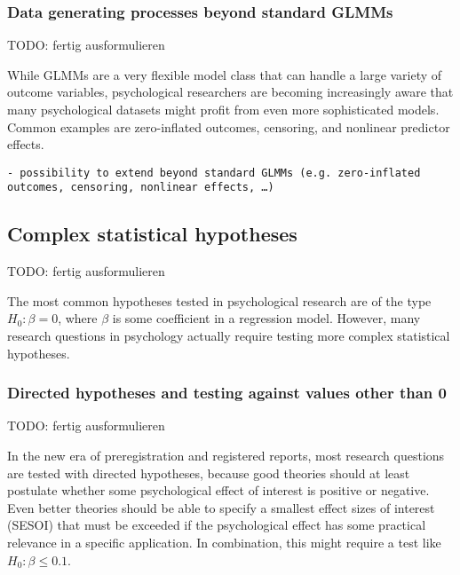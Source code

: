 \documentclass[
  man,floatsintext]{apa6}
\begin{document}
\hypertarget{data-generating-processes-beyond-standard-glmms}{%
\subsubsection{Data generating processes beyond standard GLMMs}\label{data-generating-processes-beyond-standard-glmms}}

TODO: fertig ausformulieren

While GLMMs are a very flexible model class that can handle a large variety of outcome variables, psychological researchers are becoming increasingly aware that many psychological datasets might profit from even more sophisticated models.
Common examples are zero-inflated outcomes, censoring, and nonlinear predictor effects.

\begin{verbatim}
- possibility to extend beyond standard GLMMs (e.g. zero-inflated outcomes, censoring, nonlinear effects, …)
\end{verbatim}

\hypertarget{complex-statistical-hypotheses}{%
\subsection{Complex statistical hypotheses}\label{complex-statistical-hypotheses}}

TODO: fertig ausformulieren

The most common hypotheses tested in psychological research are of the type \(H_0: \beta = 0\), where \(\beta\) is some coefficient in a regression model.
However, many research questions in psychology actually require testing more complex statistical hypotheses.

\hypertarget{directed-hypotheses-and-testing-against-values-other-than-0}{%
\subsubsection{Directed hypotheses and testing against values other than 0}\label{directed-hypotheses-and-testing-against-values-other-than-0}}

TODO: fertig ausformulieren

In the new era of preregistration and registered reports, most research questions are tested with directed hypotheses, because good theories should at least postulate whether some psychological effect of interest is positive or negative.
Even better theories should be able to specify a smallest effect sizes of interest (SESOI) that must be exceeded if the psychological effect has some practical relevance in a specific application.
In combination, this might require a test like \(H_0: \beta \leq 0.1\).
\end{document}

